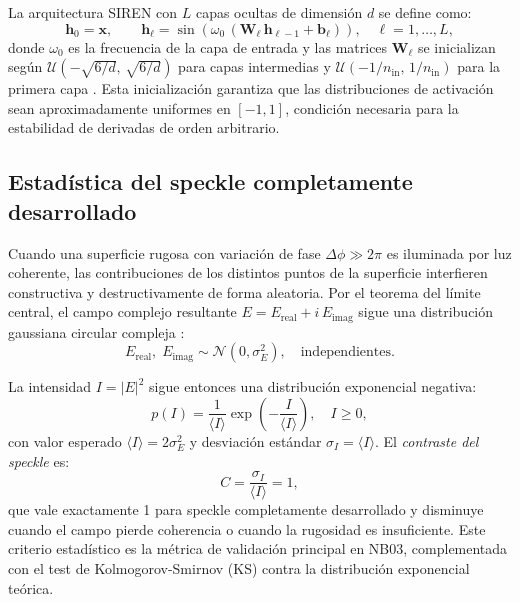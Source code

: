 La arquitectura SIREN con $L$ capas ocultas de dimensión $d$ se define como:
%
\begin{equation}
  \mathbf{h}_0 = \mathbf{x}, \qquad
  \mathbf{h}_\ell = \sin\!\left(\omega_0\,(\mathbf{W}_\ell\,\mathbf{h}_{\ell-1} + \mathbf{b}_\ell)\right),
  \quad \ell = 1, \ldots, L,
  \label{eq:siren}
\end{equation}
%
donde $\omega_0$ es la frecuencia de la capa de entrada y las matrices $\mathbf{W}_\ell$
se inicializan según $\mathcal{U}(-\sqrt{6/d},\,\sqrt{6/d})$ para capas intermedias
y $\mathcal{U}(-1/n_{\mathrm{in}},\,1/n_{\mathrm{in}})$ para la primera capa
\citep{Sitzmann2020_SIREN}.
Esta inicialización garantiza que las distribuciones de activación sean aproximadamente
uniformes en $[-1, 1]$, condición necesaria para la estabilidad de derivadas de orden
arbitrario.

\subsection{Estadística del speckle completamente desarrollado}
\label{subsec:speckle}

Cuando una superficie rugosa con variación de fase $\Delta\phi \gg 2\pi$ es iluminada
por luz coherente, las contribuciones de los distintos puntos de la superficie interfieren
constructiva y destructivamente de forma aleatoria.
Por el teorema del límite central, el campo complejo resultante
$E = E_{\mathrm{real}} + i\,E_{\mathrm{imag}}$ sigue una distribución gaussiana circular
compleja \citep{Goodman2007_Speckle}:
%
\begin{equation}
  E_{\mathrm{real}},\; E_{\mathrm{imag}} \sim \mathcal{N}(0, \sigma_E^2),
  \quad \text{independientes.}
  \label{eq:campo_gaussiano}
\end{equation}

La intensidad $I = |E|^2$ sigue entonces una distribución exponencial negativa:
%
\begin{equation}
  p(I) = \frac{1}{\langle I \rangle}\exp\!\left(-\frac{I}{\langle I \rangle}\right),
  \quad I \geq 0,
  \label{eq:pdf_intensidad}
\end{equation}
%
con valor esperado $\langle I \rangle = 2\sigma_E^2$ y desviación estándar
$\sigma_I = \langle I \rangle$.
El \textit{contraste del speckle} es:
%
\begin{equation}
  C = \frac{\sigma_I}{\langle I \rangle} = 1,
  \label{eq:contraste}
\end{equation}
%
que vale exactamente 1 para speckle completamente desarrollado y disminuye
cuando el campo pierde coherencia o cuando la rugosidad es insuficiente.
Este criterio estadístico es la métrica de validación principal en NB03,
complementada con el test de Kolmogorov-Smirnov (KS) contra la distribución
exponencial teórica.
